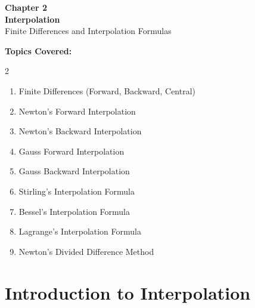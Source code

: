 \documentclass[12pt]{article}
\begin{document}
\newpage


\begin{tcolorbox}[
  enhanced, arc=0pt, boxrule=0pt,
  colback=primary, colframe=primary,
  left=20pt, right=20pt, top=28pt, bottom=20pt,
  borderline south={5pt}{0pt}{accent},
]
  \centering
  {\fontsize{22}{28}\bfseries\color{white}
    Chapter 2\\[8pt]
    Interpolation
  }\\[10pt]
  {\large\color{lightbg} Finite Differences and Interpolation Formulas}
\end{tcolorbox}

\vspace{8pt}

\begin{tcolorbox}[colback=lightbg, colframe=accent, arc=4pt, boxrule=1pt,
  left=12pt, right=12pt, top=10pt, bottom=10pt]
\textbf{\color{primary}Topics Covered:}
\begin{multicols}{2}
\begin{enumerate}[noitemsep]
  \item Finite Differences (Forward, Backward, Central)
  \item Newton's Forward Interpolation
  \item Newton's Backward Interpolation
  \item Gauss Forward Interpolation
  \item Gauss Backward Interpolation
  \item Stirling's Interpolation Formula
  \item Bessel's Interpolation Formula
  \item Lagrange's Interpolation Formula
  \item Newton's Divided Difference Method
\end{enumerate}
\end{multicols}
\end{tcolorbox}

\newpage

\section{Introduction to Interpolation}
\end{document}
